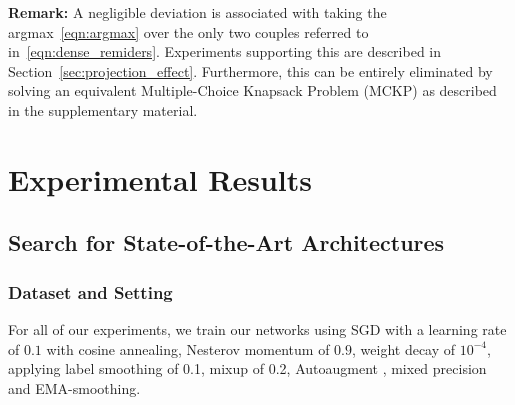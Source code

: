 \documentclass[dvipsnames,table,xcdraw]{article}
\begin{document}
\textbf{Remark:} A negligible deviation is associated with taking the argmax~\eqref{eqn:argmax} over the only two couples referred to in~\eqref{eqn:dense_remiders}. Experiments supporting this are described in Section~\ref{sec:projection_effect}. Furthermore, this can be entirely eliminated by solving an equivalent Multiple-Choice Knapsack Problem (MCKP) as described in the supplementary material.










































































 \section{Experimental Results}\label{sec:experiments}

\subsection{Search for State-of-the-Art Architectures}
\subsubsection{Dataset and Setting} \label{sec:exp_setting}
For all of our experiments, we train our networks using SGD with a learning rate of $0.1$ with cosine annealing, Nesterov momentum of $0.9$, weight decay of $10^{-4}$, applying label smoothing \cite{label_smoothing} of 0.1, mixup \cite{mixup} of 0.2, Autoaugment \cite{autoaugment}, mixed precision and EMA-smoothing.
\end{document}
